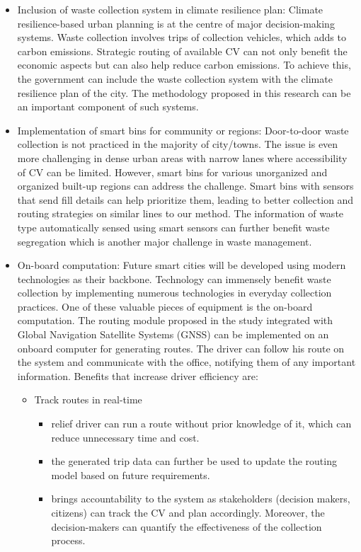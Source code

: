 \documentclass[12pt]{article}
\begin{document}
\begin{itemize}
\item Inclusion of waste collection system in climate resilience plan: Climate resilience-based urban planning is at the centre of major decision-making systems. Waste collection involves trips of collection vehicles, which adds to carbon emissions. Strategic routing of available CV can not only benefit the economic aspects but can also help reduce carbon emissions. To achieve this, the government can include the waste collection system with the climate resilience plan of the city. The methodology proposed in this research can be an important component of such systems.
    
\item Implementation of smart bins for community or regions:  Door-to-door waste collection is not practiced in the majority of city/towns. The issue is even more challenging in dense urban areas with narrow lanes where accessibility of CV can be limited. However, smart bins for various unorganized and organized built-up regions can address the challenge. Smart bins with sensors that send fill details can help prioritize them, leading to better collection and routing strategies on similar lines to our method. The information of waste type automatically sensed using smart sensors can further benefit waste segregation which is another major challenge in waste management.\parencite{actionplan}

 \item On-board computation: Future smart cities will be developed using modern technologies as their backbone. Technology can immensely benefit waste collection by implementing numerous technologies in everyday collection practices. One of these valuable pieces of equipment is the on-board computation. The routing module proposed in the study integrated with Global Navigation Satellite Systems (GNSS) can be implemented on an onboard computer for generating routes. The driver can follow his route on the system and communicate with the office, notifying them of any important information. Benefits that increase driver efficiency are:
 \begin{itemize}
 \item Track routes in real-time
   \begin{itemize}
 \item relief driver can run a route without prior knowledge of it, which can reduce unnecessary time and cost.\item the generated trip data can further be used to update the routing model based on future requirements.
   \item brings accountability to the system as stakeholders (decision makers, citizens) can track the CV and plan accordingly. Moreover, the decision-makers can quantify the effectiveness of the collection process. 
    

\end{itemize}
\end{itemize}
\end{itemize}
\end{document}
